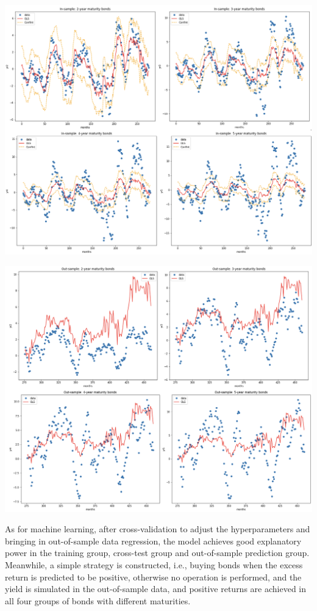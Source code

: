 \documentclass[12pt]{article}
\begin{document}
\centerline{\includegraphics[scale=0.55]{Figure3.png}}
\centerline{\includegraphics[scale=0.55]{Figure4.png}}
As for machine learning, after cross-validation to adjust the hyperparameters and bringing in out-of-sample data regression, the model achieves good explanatory power in the training group, cross-test group and out-of-sample prediction group. Meanwhile, a simple strategy is constructed, i.e., buying bonds when the excess return is predicted to be positive, otherwise no operation is performed, and the yield is simulated in the out-of-sample data, and positive returns are achieved in all four groups of bonds with different maturities.
\end{document}
